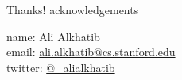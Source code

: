 \documentclass[presentation]{subfiles}
\begin{document}
  \begin{frame}{Thanks!}
  acknowledgements
  
      name: {Ali Alkhatib} \\
      email: \href{mailto:ali.alkhatib@cs.stanford.edu}{ali.alkhatib@cs.stanford.edu} \\
      twitter: \href{https://twitter.com/_alialkhatib}{@\_alialkhatib} \\
  \end{frame}
\end{document}
